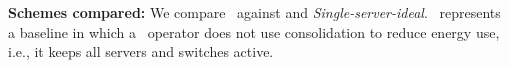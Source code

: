 %

%
%


\textbf{Schemes compared:} We compare \shrink\ against \emph{\peakS} and \emph{Single-server-ideal}. \peakS\ represents a baseline in which a \cdc\ operator does not use consolidation to reduce energy use, i.e., it keeps all servers and switches active.

